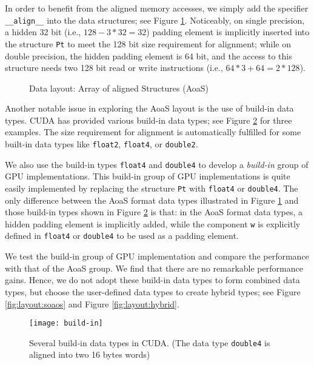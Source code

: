In order to benefit from the aligned memory accesses, we simply add the 
specifier \texttt{{\_}{\_}align{\_}{\_}} into the data structures; see Figure \ref{fig:layout:aoas}. 
Noticeably, on single precision, a hidden 32 bit (i.e., $128 - 3 * 32 = 32$) 
padding element is implicitly inserted into the structure \texttt{Pt} to meet the 128 
bit size requirement for alignment; while on double precision, the hidden 
padding element is 64 bit, and the access to this structure needs two 128 
bit read or write instructions (i.e., $64 * 3 + 64 = 2 * 128$). 

\begin{figure}[htb]
    \centering
    \caption{Data layout: Array of aligned Structures (AoaS)}
    \label{fig:layout:aoas}       \end{figure}

Another notable issue in exploring the AoaS layout is the use of build-in data types. CUDA has provided various build-in data types; see Figure \ref{fig:layout:buildin} for three examples. The size requirement for alignment is automatically fulfilled for some built-in data types like \texttt{float2}, \texttt{float4}, or \texttt{double2}. 

We also use the build-in types \texttt{float4} and \texttt{double4} to develop a \textit{build-in} group of GPU implementations. This build-in group of GPU implementations is quite easily implemented by replacing the structure \texttt{Pt} with \texttt{float4} or \texttt{double4}. The only difference between the AoaS format data types illustrated in Figure \ref{fig:layout:aoas} and those build-in types shown in Figure \ref{fig:layout:buildin} is that: in the AoaS format data types, a hidden padding element is implicitly added, while the component \texttt{w} is explicitly defined in \texttt{float4} or \texttt{double4} to be used as a padding element. 

We test the build-in group of GPU implementation and compare the performance with that of the AoaS group. We find that there are no remarkable performance gains. Hence, we do not adopt these build-in data types to form combined data types, but choose the user-defined data types to create hybrid types; see Figure \ref{fig:layout:soaos} and Figure \ref{fig:layout:hybrid}.


\begin{figure}[htb]
\centering
    \texttt{[image: build-in]}
    \caption{Several build-in data types in CUDA. (The data type \texttt{double4} is aligned into two 16 bytes words)}
    \label{fig:layout:buildin}       \end{figure}

